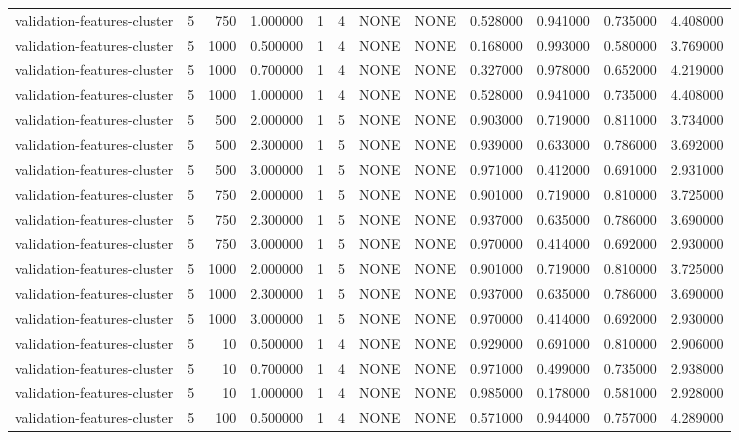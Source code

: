 \begin{tabular}{lrrrllllrrrr}
validation-features-cluster & 5 & 750 & 1.000000 & 1 & 4 & NONE & NONE & 0.528000 & 0.941000 & 0.735000 & 4.408000 \\
validation-features-cluster & 5 & 1000 & 0.500000 & 1 & 4 & NONE & NONE & 0.168000 & 0.993000 & 0.580000 & 3.769000 \\
validation-features-cluster & 5 & 1000 & 0.700000 & 1 & 4 & NONE & NONE & 0.327000 & 0.978000 & 0.652000 & 4.219000 \\
validation-features-cluster & 5 & 1000 & 1.000000 & 1 & 4 & NONE & NONE & 0.528000 & 0.941000 & 0.735000 & 4.408000 \\
validation-features-cluster & 5 & 500 & 2.000000 & 1 & 5 & NONE & NONE & 0.903000 & 0.719000 & 0.811000 & 3.734000 \\
validation-features-cluster & 5 & 500 & 2.300000 & 1 & 5 & NONE & NONE & 0.939000 & 0.633000 & 0.786000 & 3.692000 \\
validation-features-cluster & 5 & 500 & 3.000000 & 1 & 5 & NONE & NONE & 0.971000 & 0.412000 & 0.691000 & 2.931000 \\
validation-features-cluster & 5 & 750 & 2.000000 & 1 & 5 & NONE & NONE & 0.901000 & 0.719000 & 0.810000 & 3.725000 \\
validation-features-cluster & 5 & 750 & 2.300000 & 1 & 5 & NONE & NONE & 0.937000 & 0.635000 & 0.786000 & 3.690000 \\
validation-features-cluster & 5 & 750 & 3.000000 & 1 & 5 & NONE & NONE & 0.970000 & 0.414000 & 0.692000 & 2.930000 \\
validation-features-cluster & 5 & 1000 & 2.000000 & 1 & 5 & NONE & NONE & 0.901000 & 0.719000 & 0.810000 & 3.725000 \\
validation-features-cluster & 5 & 1000 & 2.300000 & 1 & 5 & NONE & NONE & 0.937000 & 0.635000 & 0.786000 & 3.690000 \\
validation-features-cluster & 5 & 1000 & 3.000000 & 1 & 5 & NONE & NONE & 0.970000 & 0.414000 & 0.692000 & 2.930000 \\
validation-features-cluster & 5 & 10 & 0.500000 & 1 & 4 & NONE & NONE & 0.929000 & 0.691000 & 0.810000 & 2.906000 \\
validation-features-cluster & 5 & 10 & 0.700000 & 1 & 4 & NONE & NONE & 0.971000 & 0.499000 & 0.735000 & 2.938000 \\
validation-features-cluster & 5 & 10 & 1.000000 & 1 & 4 & NONE & NONE & 0.985000 & 0.178000 & 0.581000 & 2.928000 \\
validation-features-cluster & 5 & 100 & 0.500000 & 1 & 4 & NONE & NONE & 0.571000 & 0.944000 & 0.757000 & 4.289000 \\

\end{tabular}
